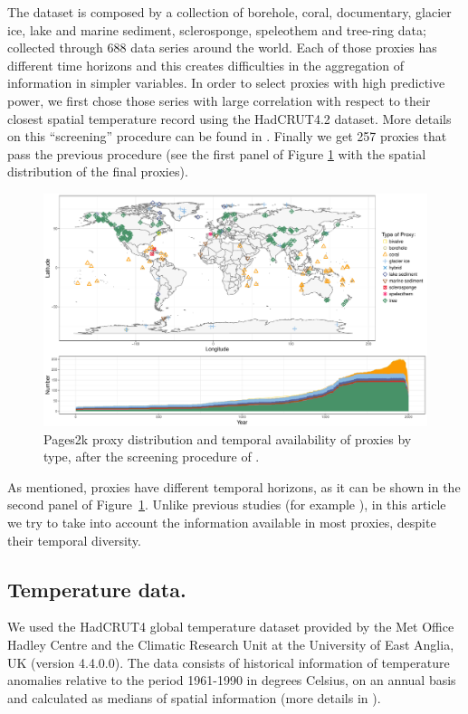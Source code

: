 \documentclass[11pt]{amsart}
\theoremstyle{plain}
\theoremstyle{definition}
\theoremstyle{remark}
\begin{document}
The dataset is composed by a collection of borehole, coral, documentary, glacier
ice, lake and marine 
sediment, sclerosponge, speleothem and tree-ring data; collected through 688
data series around the world. Each of those proxies
has different time horizons and this creates difficulties in the aggregation of
information in simpler variables.  In order to select proxies with high
predictive power, we first chose those series with large correlation with respect to
their closest spatial temperature record using the HadCRUT4.2 dataset. More
details on this ``screening'' procedure can be found in \cite{Emile-Geay2015}. Finally we get 257 proxies
that pass the previous procedure (see the first panel of Figure \ref{fig:proxy} with the spatial
distribution of the final proxies).   
\begin{figure}
  \centering
  \includegraphics[scale=0.45]{CombinedMap_Area}
  \caption{Pages2k proxy distribution and temporal availability of proxies by
    type, after the screening procedure of \cite{Emile-Geay2015}.}
  \label{fig:proxy}
\end{figure}
As mentioned, proxies have different temporal horizons, as it can be shown in the
second panel of Figure~\ref{fig:proxy}. Unlike previous studies (for example \cite{Barboza2014}), in this article we try to take into account the information available in most proxies, despite their temporal diversity.


\subsection{Temperature data.}
We used the HadCRUT4 global temperature dataset provided by the Met Office Hadley
Centre and the Climatic Research Unit at the University of East Anglia, UK (version 4.4.0.0). The
data consists of historical information of temperature anomalies relative to the
period 1961-1990 in degrees Celsius, on an annual basis and calculated as
medians of spatial information (more details in \cite{Morice2012}).
\end{document}
